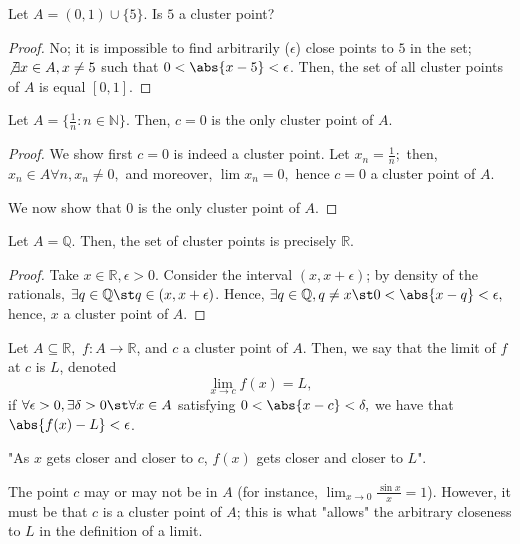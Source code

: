 \documentclass[12pt]{article}
\begin{document}
\begin{example}
  Let $A = (0,1) \cup \{5\}$. Is $5$ a cluster point?
  \begin{proof}
    No; it is impossible to find arbitrarily ($\epsilon$) close points to $5$ in the set; $\not\exists x \in A, x \neq 5$ such that $0 < \abs{x - 5} < \epsilon$. Then, the set of all cluster points of $A$ is equal $[0,1]$.
  \end{proof}
\end{example}

\begin{example}
  Let $A = \{\frac{1}{n} : n \in \mathbb{N}\}$. Then, $c = 0$ is the only cluster point of $A$.
  \begin{proof}
    We show first $c = 0$ is indeed a cluster point. Let $x_n = \frac{1}{n};$ then, $x_n \in A \forall n, x_n \neq 0, $ and moreover, $\lim x_n = 0,$ hence $c = 0$ a cluster point of $A$.

    We now show that $0$ is the only cluster point of $A$. %
  \end{proof}
\end{example}

\begin{example}
Let $A = \mathbb{Q}$. Then, the set of cluster points is precisely $\mathbb{R}$.

\begin{proof}
  Take $x \in \mathbb{R}, \epsilon > 0$. Consider the interval $(x, x + \epsilon)$; by density of the rationals, $\exists q \in \mathbb{Q} \st q \in (x, x + \epsilon)$. Hence, $\exists q \in \mathbb{Q}, q \neq x \st 0 < \abs{x - q} < \epsilon,$ hence, $x$ a cluster point of $A$.
\end{proof}
\end{example}

\begin{definition}
  Let $A \subseteq \mathbb{R},$ $f : A \to \mathbb{R}$, and $c$ a cluster point of $A$. Then, we say that the limit of $f$ at $c$ is $L$, denoted \[\lim_{x \to c} f(x) = L,\] if $\forall \epsilon > 0, \exists \delta > 0 \st \forall x \in A$ satisfying $0 < \abs{x - c} < \delta,$ we have that $\abs{f(x) - L} < \epsilon$.
\end{definition}

\begin{remark}
  "As $x$ gets closer and closer to $c$, $f(x)$ gets closer and closer to $L$".
\end{remark}

\begin{remark}
  The point $c$ may or may not be in $A$ (for instance, $\lim_{x \to 0} \frac{\sin x}{x} = 1$). However, it must be that $c$ is a cluster point of $A$; this is what "allows" the arbitrary closeness to $L$ in the definition of a limit.
\end{remark}
\end{document}
